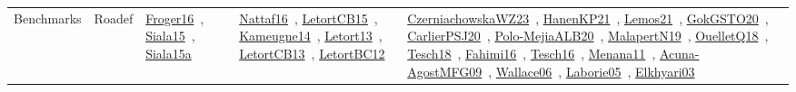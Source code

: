 {\begin{longtable}{lp{3cm}>{\raggedright\arraybackslash}p{6cm}>{\raggedright\arraybackslash}p{6cm}>{\raggedright\arraybackslash}p{8cm}}
\index{Roadef}\index{Benchmarks!Roadef}Benchmarks & Roadef & \href{../works/Froger16.pdf}{Froger16}~\cite{Froger16}, \href{../works/Siala15.pdf}{Siala15}~\cite{Siala15}, \href{../works/Siala15a.pdf}{Siala15a}~\cite{Siala15a} & \href{../works/Nattaf16.pdf}{Nattaf16}~\cite{Nattaf16}, \href{../works/LetortCB15.pdf}{LetortCB15}~\cite{LetortCB15}, \href{../works/Kameugne14.pdf}{Kameugne14}~\cite{Kameugne14}, \href{../works/Letort13.pdf}{Letort13}~\cite{Letort13}, \href{../works/LetortCB13.pdf}{LetortCB13}~\cite{LetortCB13}, \href{../works/LetortBC12.pdf}{LetortBC12}~\cite{LetortBC12} & \href{../works/CzerniachowskaWZ23.pdf}{CzerniachowskaWZ23}~\cite{CzerniachowskaWZ23}, \href{../works/HanenKP21.pdf}{HanenKP21}~\cite{HanenKP21}, \href{../works/Lemos21.pdf}{Lemos21}~\cite{Lemos21}, \href{../works/GokGSTO20.pdf}{GokGSTO20}~\cite{GokGSTO20}, \href{../works/CarlierPSJ20.pdf}{CarlierPSJ20}~\cite{CarlierPSJ20}, \href{../works/Polo-MejiaALB20.pdf}{Polo-MejiaALB20}~\cite{Polo-MejiaALB20}, \href{../works/MalapertN19.pdf}{MalapertN19}~\cite{MalapertN19}, \href{../works/OuelletQ18.pdf}{OuelletQ18}~\cite{OuelletQ18}, \href{../works/Tesch18.pdf}{Tesch18}~\cite{Tesch18}, \href{../works/Fahimi16.pdf}{Fahimi16}~\cite{Fahimi16}, \href{../works/Tesch16.pdf}{Tesch16}~\cite{Tesch16}, \href{../works/Menana11.pdf}{Menana11}~\cite{Menana11}, \href{../works/Acuna-AgostMFG09.pdf}{Acuna-AgostMFG09}~\cite{Acuna-AgostMFG09}, \href{../works/Wallace06.pdf}{Wallace06}~\cite{Wallace06}, \href{../works/Laborie05.pdf}{Laborie05}~\cite{Laborie05}, \href{../works/Elkhyari03.pdf}{Elkhyari03}~\cite{Elkhyari03}\\

\end{longtable}}
